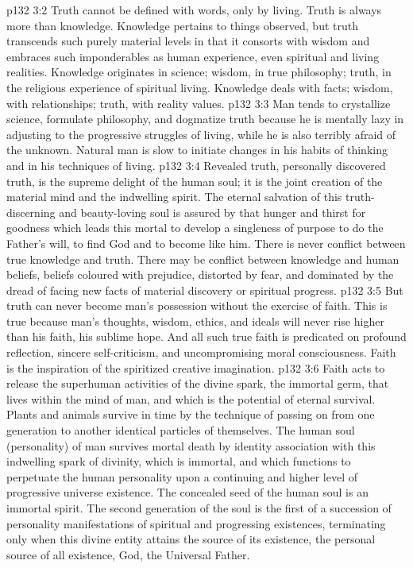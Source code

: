 \vs p132 3:2 \pc Truth cannot be defined with words, only by living. Truth is always more than knowledge. Knowledge pertains to things observed, but truth transcends such purely material levels in that it consorts with wisdom and embraces such imponderables as human experience, even spiritual and living realities. Knowledge originates in science; wisdom, in true philosophy; truth, in the religious experience of spiritual living. Knowledge deals with facts; wisdom, with relationships; truth, with reality values.
\vs p132 3:3 Man tends to crystallize science, formulate philosophy, and dogmatize truth because he is mentally lazy in adjusting to the progressive struggles of living, while he is also terribly afraid of the unknown. Natural man is slow to initiate changes in his habits of thinking and in his techniques of living.
\vs p132 3:4 Revealed truth, personally discovered truth, is the supreme delight of the human soul; it is the joint creation of the material mind and the indwelling spirit. The eternal salvation of this truth\hyp{}discerning and beauty\hyp{}loving soul is assured by that hunger and thirst for goodness which leads this mortal to develop a singleness of purpose to do the Father’s will, to find God and to become like him. There is never conflict between true knowledge and truth. There may be conflict between knowledge and human beliefs, beliefs coloured with prejudice, distorted by fear, and dominated by the dread of facing new facts of material discovery or spiritual progress.
\vs p132 3:5 But truth can never become man’s possession without the exercise of faith. This is true because man’s thoughts, wisdom, ethics, and ideals will never rise higher than his faith, his sublime hope. And all such true faith is predicated on profound reflection, sincere self\hyp{}criticism, and uncompromising moral consciousness. Faith is the inspiration of the spiritized creative imagination.
\vs p132 3:6 Faith acts to release the superhuman activities of the divine spark, the immortal germ, that lives within the mind of man, and which is the potential of eternal survival. Plants and animals survive in time by the technique of passing on from one generation to another identical particles of themselves. The human soul (personality) of man survives mortal death by identity association with this indwelling spark of divinity, which is immortal, and which functions to perpetuate the human personality upon a continuing and higher level of progressive universe existence. The concealed seed of the human soul is an immortal spirit. The second generation of the soul is the first of a succession of personality manifestations of spiritual and progressing existences, terminating only when this divine entity attains the source of its existence, the personal source of all existence, God, the Universal Father.
